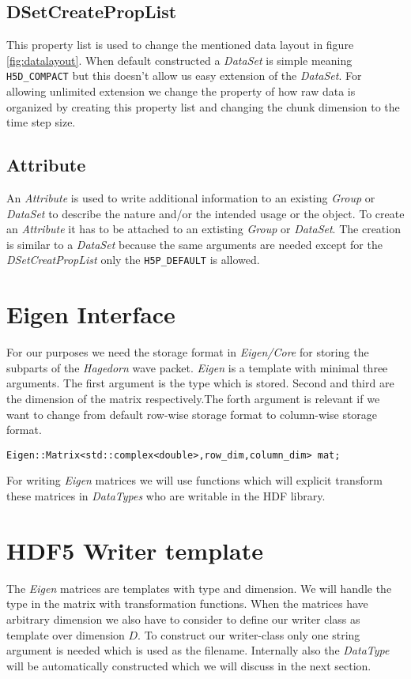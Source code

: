 \documentclass{article}
\begin{document}
\subsection{DSetCreatePropList}
This property list is used to change the mentioned data layout in figure \ref{fig:datalayout}. %
When default constructed a \textit{DataSet} is simple meaning \texttt{H5D\_COMPACT} but this doesn't allow us easy extension of the \textit{DataSet}. For allowing unlimited extension we change the property of how raw data is organized by creating this property list and changing the chunk dimension to the time step size.

\subsection{Attribute}
An \textit{Attribute} is used to write additional information to an existing \textit{Group} or \textit{DataSet} to describe the nature and/or the intended usage or the object. To create an \textit{Attribute} it has to be attached to an extisting \textit{Group} or \textit{DataSet}. The creation is similar to a \textit{DataSet} because the same arguments are needed except for the \textit{DSetCreatPropList} only the \texttt{H5P\_DEFAULT} is allowed.



\section{Eigen Interface}
For our purposes we need the storage format in \textit{Eigen/Core} for storing the subparts of the \textit{Hagedorn} wave packet. \textit{Eigen} is a template with minimal three arguments. The first argument is the type which is stored. Second and third are the dimension of the matrix respectively.The forth argument is relevant if we want to change from default row-wise storage format to column-wise storage format.
\begin{lstlisting}
Eigen::Matrix<std::complex<double>,row_dim,column_dim> mat;
\end{lstlisting}
For writing \textit{Eigen} matrices we will use functions which will explicit transform these matrices in \textit{DataTypes} who are writable in the HDF library.

\section{HDF5 Writer template}
The \textit{Eigen} matrices are templates with type and dimension. We will handle the type in the matrix with transformation functions. When the matrices have arbitrary dimension we also have to consider to define our writer class as template over dimension $D$. To construct our writer-class only one string argument is needed which is used as the filename. Internally also the \textit{DataType} will be automatically constructed which we will discuss in the next section.
\end{document}
